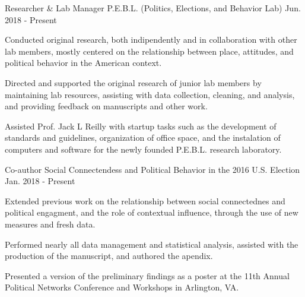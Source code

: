 

\begin{cventries}

    \cventry
      {Researcher \& Lab Manager} %
      {P.E.B.L. (Politics, Elections, and Behavior Lab)} %
      {Jun. 2018 - Present} %
      {} %
      {
        \begin{cvitems} %
          \item {Conducted original research, both indipendently and in collaboration with other lab members, mostly centered on the relationship between place, attitudes, and political behavior in the American context.}
          \item {Directed and supported the original research of junior lab members by maintaining lab resources, assisting with data collection, cleaning, and analysis, and providing feedback on manuscripts and other work.}
          \item {Assisted Prof. Jack L Reilly with startup tasks such as the development of standards and guidelines, organization of office space, and the instalation of computers and software for the newly founded P.E.B.L. research laboratory.}
      \end{cvitems}
      }
    \cventry
      {Co-author} %
      {Social Connectendess and Political Behavior in the 2016 U.S. Election} %
      {Jan. 2018 - Present} %
      {} %
      {
        \begin{cvitems} %
          \item {Extended previous work on the relationship between social connectednes and political engagment, and the role of contextual influence, through the use of new measures and fresh data.}
          \item {Performed nearly all data management and statistical analysis, assisted with the production of the manuscript, and authored the apendix.}
          \item {Presented a version of the preliminary findings as a poster at the 11th Annual Political Networks Conference and Workshops in Arlington, VA.}

\end{cvitems}}
\end{cventries}
